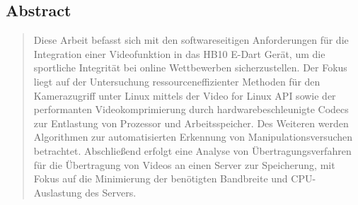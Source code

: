 
{
\titleformat{\subsection}[block]{\normalfont\normalsize\bfseries\filcenter}{}{0pt}{}
	\subsection*{Abstract}

	\begin{quote}
	{\fontsize{9}{11}\selectfont
		Diese Arbeit befasst sich mit den softwareseitigen Anforderungen für die Integration einer Videofunktion in das HB10 E-Dart Gerät, um die sportliche Integrität bei online Wettbewerben sicherzustellen. 
		Der Fokus liegt auf der Untersuchung ressourceneffizienter Methoden für den Kamerazugriff unter Linux mittels der Video for Linux API sowie der performanten Videokomprimierung durch 
		hardwarebeschleunigte Codecs zur Entlastung von Prozessor und Arbeitsspeicher. Des Weiteren werden Algorithmen zur automatisierten Erkennung von Manipulationsversuchen betrachtet. 
		Abschließend erfolgt eine Analyse von Übertragungsverfahren für die Übertragung von Videos an einen Server zur Speicherung, 
		mit Fokus auf die Minimierung der benötigten Bandbreite und CPU-Auslastung des Servers.
	}
	\end{quote}
	

	\vspace{1.2em}
}